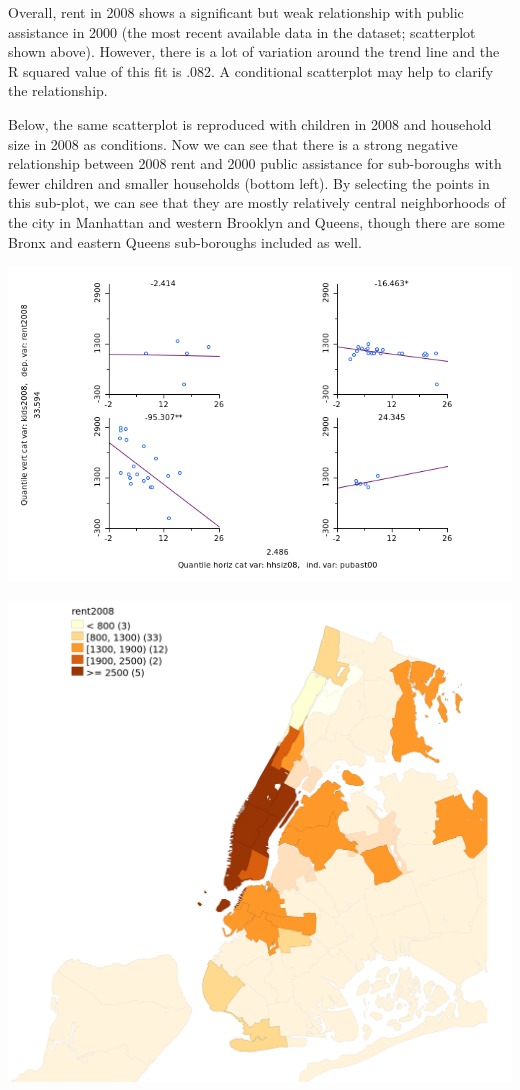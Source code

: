 \documentclass[11pt]{article}
\begin{document}
Overall, rent in 2008 shows a significant but weak relationship with public assistance in 2000 (the most recent available data in the dataset; scatterplot shown above). However, there is a lot of variation around the trend line and the R squared value of this fit is .082. A conditional scatterplot may help to clarify the relationship.

Below, the same scatterplot is reproduced with children in 2008 and
household size in 2008 as conditions. Now we can see that there is a
strong negative relationship between 2008 rent and 2000 public assistance for sub-boroughs with fewer children and smaller households (bottom left). By selecting the points in this sub-plot, we can see that they are mostly relatively central neighborhoods of the city in Manhattan and western Brooklyn and Queens, though there are some Bronx and eastern Queens sub-boroughs included as well.

\begin{center}
\includegraphics[width=.9\linewidth]{conditional_scatter.png}
\end{center}
\begin{center}
\includegraphics[width=.9\linewidth]{map_conditional_scatter.png}
\end{center}
\end{document}
